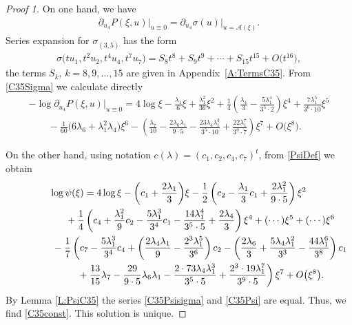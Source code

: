 \documentclass[pdftex]{sigma}
\numberwithin{equation}{section}
\begin{document}
\begin{proof}[Proof 1]
On one hand, we have
\begin{gather*}
 \partial_{u_4} P(\xi,u) \big|_{u\equiv 0} = \partial_{u_4} \sigma (u) \big|_{u = \mathcal{A}(\xi)}.
\end{gather*}
Series expansion for $\sigma_{(3,5)}$ has the form
\begin{gather}\label{C35Sigma}
 \sigma\big(t u_1,t^2 u_2,t^4 u_4,t^7 u_7\big) = S_8 t^8 + S_9 t^9 + \cdots + S_{15} t^{15} + O\big(t^{16}\big),
\end{gather}
the terms $S_k$, $k=8,9,\dots,15$ are given in Appendix~\ref{A:TermsC35}. From \eqref{C35Sigma} we calculate directly
\begin{gather}
 -\log \partial_{u_4} P(\xi,u) \big|_{u\equiv 0} = 4\log \xi - \frac{\lambda_1}{6} \xi +
 \frac{\lambda_1^2}{36}\xi^2 + \frac{1}{4}\left(\frac{\lambda_4}{3} - \frac{5 \lambda_1^4}{3^5\cdot 2}\right) \xi^4
 + \frac{7 \lambda_1^5}{3^6 \cdot 10} \xi^5 \nonumber\\
 \qquad{}- \frac{1}{60}\big(6\lambda_6 + \lambda_1^2 \lambda_4\big) \xi^6
 - \left(\frac{\lambda_7}{10} - \frac{2\lambda_6 \lambda_1}{9\cdot 5}
 - \frac{23 \lambda_4 \lambda_1^3}{3^5\cdot 10} + \frac{22 \lambda_1^7}{3^9\cdot 7}\right) \xi^7 + O\big(\xi^8\big).\label{C35Psisigma}
\end{gather}

On the other hand, using notation $c(\lambda)=(c_1,c_2,c_4,c_7)^t$, from \eqref{PsiDef} we obtain
\begin{gather}
\log \psi(\xi) = 4 \log \xi - \bigg(c_1 + \frac{2 \lambda_1}{3}\bigg) \xi
 -\frac{1}{2} \left(c_2 - \frac{\lambda_1}{3} c_1 + \frac{2\lambda_1^2}{9\cdot 5} \right) \xi^2\nonumber\\
\hphantom{\log \psi(\xi) =}{} + \frac{1}{4} \left(c_4 + \frac{\lambda_1^2}{9}c_2 - \frac{5\lambda_1^3}{3^4} c_1 -
 \frac{14 \lambda_1^4}{3^5 \cdot 5} + \frac{2\lambda_4}{3} \right) \xi^4 +
 (\cdots) \xi^5 + (\cdots) \xi^6 \nonumber\\
 \hphantom{\log \psi(\xi) =}{} -
 \frac{1}{7} \left(c_7 - \frac{5 \lambda_1^3}{3^4} c_4 + \left(\frac{2\lambda_4 \lambda_1}{9}
 - \frac{2^3 \lambda_1^5}{3^6} \right) c_2 - \left(\frac{2\lambda_6}{3} + \frac{5 \lambda_4 \lambda_1^2}{3^3}
 - \frac{44 \lambda_1^6}{3^8} \right) c_1 \right.\nonumber\\
\left. \hphantom{\log \psi(\xi) =}{}+ \frac{13}{15}\lambda_7 - \frac{29}{9\cdot 5} \lambda_6\lambda_1
 - \frac{2\cdot 73 \lambda_4 \lambda_1^3}{3^5\cdot 5} + \frac{2^3 \cdot 19 \lambda_1^7}{3^9\cdot 5} \right)\xi^7 + O\big(\xi^8\big). \label{C35Psi}
\end{gather}
By Lemma \ref{L:PsiC35} the series \eqref{C35Psisigma} and \eqref{C35Psi} are equal. Thus, we find \eqref{C35const}. {This solution is unique.}
\end{proof}
\end{document}
